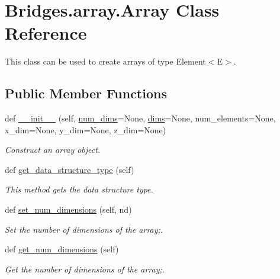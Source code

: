 \hypertarget{class_bridges_1_1array_1_1_array}{}\section{Bridges.\+array.\+Array Class Reference}
\label{class_bridges_1_1array_1_1_array}


This class can be used to create arrays of type Element$<$\+E$>$.  


\subsection*{Public Member Functions}
\begin{DoxyCompactItemize}
\item 
def \mbox{\hyperlink{class_bridges_1_1array_1_1_array_a51bf3ede77b0b9090a15c6119d4b9a3e}{\+\_\+\+\_\+init\+\_\+\+\_\+}} (self, \mbox{\hyperlink{class_bridges_1_1array_1_1_array_a82ed37448b0bdb13519b85f8e8bc81e2}{num\+\_\+dims}}=None, \mbox{\hyperlink{class_bridges_1_1array_1_1_array_ac037f96fff9569134da9d66e33bc1f0f}{dims}}=None, num\+\_\+elements=None, x\+\_\+dim=None, y\+\_\+dim=None, z\+\_\+dim=None)
\begin{DoxyCompactList}\small\item\em Construct an array object. \end{DoxyCompactList}\item 
def \mbox{\hyperlink{class_bridges_1_1array_1_1_array_a8eba6b421a7d390c622ff473ae5b5cb1}{get\+\_\+data\+\_\+structure\+\_\+type}} (self)
\begin{DoxyCompactList}\small\item\em This method gets the data structure type. \end{DoxyCompactList}\item 
def \mbox{\hyperlink{class_bridges_1_1array_1_1_array_a0fdf82b7a0f6cb04b41db28a27a1a488}{set\+\_\+num\+\_\+dimensions}} (self, nd)
\begin{DoxyCompactList}\small\item\em Set the number of dimensions of the array;. \end{DoxyCompactList}\item 
def \mbox{\hyperlink{class_bridges_1_1array_1_1_array_abfebdd85d851c303279872803e67c0aa}{get\+\_\+num\+\_\+dimensions}} (self)
\begin{DoxyCompactList}\small\item\em Get the number of dimensions of the array;. \end{DoxyCompactList}\item 

\end{DoxyCompactItemize}
